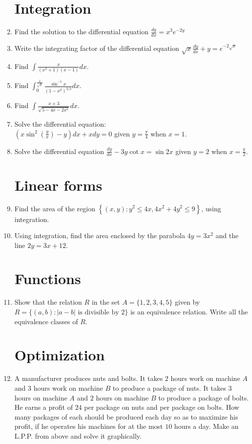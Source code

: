 \documentclass[10pt,-letter paper]{article}
\providecommand{\cbrak}[1]{\ensuremath{\left\{#1\right\}}}
\providecommand{\brak}[1]{\ensuremath{\left(#1\right)}}
\begin{document}
\begin{enumerate}
\section{Integration}
\item Find the solution to the differential equation 
$\frac{dy}{dx} = x^{3}e^{-2y}$
\item Write the integrating factor of the differential equation
$\sqrt{x}\frac{dy}{dx} + y = e^{-2\sqrt{x}}$ \\
\item Find $\int \frac{x}{\brak{x^2+1}\brak{x-1}}dx$.\\
\item Find $\int_{0}^{\frac{1}{\sqrt{2}}} \frac{\sin^{-1}x}{{\brak{1-x^2}}^{3/2}}dx$.\\
\item Find $\int \frac{x+3}{\sqrt{5-4x-2x^2}}dx$.\\
\item Solve the differential equation: \\
$\brak{x\sin^2{\brak{\frac{y}{x}}}-y}dx +xdy = 0$ given $y = \frac{\pi}{4}$ when $x=1$.\\
\item Solve the differential equation $\frac{dy}{dx}-3y\cot{x} = \sin{2x}$ given $y=2$ when $x=\frac{\pi}{2}$.\\
\section{Linear forms}
\item Find the area of the region $\cbrak{\brak{x,y} : y^2 \leq 4x, 4x^2+4y^2 \leq 9}$, using integration.\\
\item Using integration, find the area enclosed by the parabola $4y = 3x^2$ and the line $2y = 3x+12$. \\
\section{Functions}
\item Show that the relation $R$ in the set $A = \{1,2,3,4,5\}$ given by $R = \{\brak{a,b} : |a-b| \text{ is divisible by 2}\}$ is an equivalence relation. Write all the equivalence classes of $R$. \\ 
\section{Optimization}
\item A manufacturer produces nuts and bolts. It takes $2$ hours work on machine $A$ and $3$ hours work on machine $B$ to produce a package of nuts. It takes $3$ hours on machine $A$ and $2$ hours on machine $B$ to produce a package of bolts. He earns a profit of \rupee $24$ per package on nuts and  per package on bolts. How many packages of each should be produced each day so as to maximize his profit, if he operates his machines for at the most $10$ hours a day. Make an L.P.P. from above and solve it graphically.
\end{enumerate}
\end{document}
